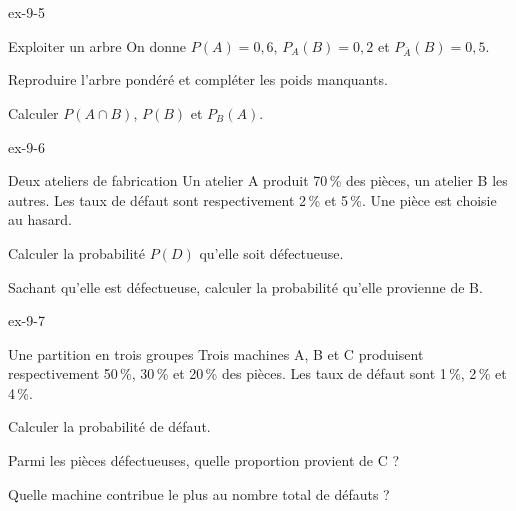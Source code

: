 \begin{blocLivre}{ex-9-5}
\begin{exercice}[1]{Exploiter un arbre}
On donne $P(A)=0{,}6$, $P_A(B)=0{,}2$ et $P_{\overline A}(B)=0{,}5$.\begin{questions}
\item Reproduire l’arbre pondéré et compléter les poids manquants.
\item Calculer $P(A\cap B)$, $P(B)$ et $P_B(A)$.
\end{questions}
\label{figlivre-r09-05-ex}

\end{exercice}
\end{blocLivre}
\clearpage
{}
\begin{blocLivre}{ex-9-6}
\begin{exercice}[2]{Deux ateliers de fabrication}
Un atelier A produit 70\,\% des pièces, un atelier B les autres. Les taux de défaut sont respectivement 2\,\% et 5\,\%. Une pièce est choisie au hasard.\begin{questions}
\item Calculer la probabilité $P(D)$ qu’elle soit défectueuse.
\item Sachant qu’elle est défectueuse, calculer la probabilité qu’elle provienne de B.
\end{questions}
\label{figlivre-r09-06-ex}

\end{exercice}
\end{blocLivre}
\begin{blocLivre}{ex-9-7}
\begin{exercice}[2]{Une partition en trois groupes}
Trois machines A, B et C produisent respectivement 50\,\%, 30\,\% et 20\,\% des pièces. Les taux de défaut sont 1\,\%, 2\,\% et 4\,\%.\begin{questions}
\item Calculer la probabilité de défaut.
\item Parmi les pièces défectueuses, quelle proportion provient de C ?
\item Quelle machine contribue le plus au nombre total de défauts ?
\end{questions}
\label{figlivre-r09-07-ex}

\end{exercice}
\end{blocLivre}

